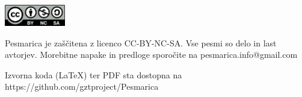\documentclass[a4paper,12pt]{article}
\begin{document}
\clearpage
\clearpage
\null
\vfill
\center
\includegraphics[width=100px]{img/licence.png}

Pesmarica je zaščitena z licenco CC-BY-NC-SA. Vse pesmi so delo in last avtorjev. Morebitne napake in predloge sporočite na pesmarica.info@gmail.com 

Izvorna koda (LaTeX) ter PDF sta dostopna na https://github.com/gztproject/Pesmarica
\end{document}
